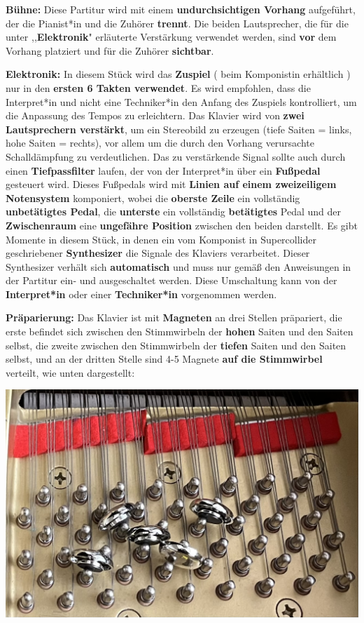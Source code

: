 \documentclass[12pt]{article}
\newcommand*\circled[1]{\tikz[baseline=(char.base)]{
            \node[shape=circle,draw,inner sep=1pt] (char) {#1};}}
\begin{document}
\begingroup
\textbf{Bühne: \circled{1}} Diese Partitur wird mit einem \textbf{undurchsichtigen Vorhang} aufgeführt, der die Pianist*in und die Zuhörer \textbf{trennt}. Die beiden Lautsprecher, die für die unter ,,\textbf{Elektronik}" erläuterte Verstärkung verwendet werden, sind \textbf{vor} dem Vorhang platziert und für die Zuhörer \textbf{sichtbar}.
\endgroup

\begingroup
\textbf{Elektronik: \circled{1}} In diesem Stück wird das \textbf{Zuspiel} ( beim Komponistin erhältlich ) nur in den \textbf{ersten 6 Takten verwendet}. Es wird empfohlen, dass die Interpret*in und nicht eine Techniker*in den Anfang des Zuspiels kontrolliert, um die Anpassung des Tempos zu erleichtern. \textbf{\circled{2}} Das Klavier wird von \textbf{zwei Lautsprechern verstärkt}, um ein Stereobild zu erzeugen (tiefe Saiten = links, hohe Saiten = rechts), vor allem um die durch den Vorhang verursachte Schalldämpfung zu verdeutlichen. \textbf{\circled{3}} Das zu verstärkende Signal sollte auch durch einen \textbf{Tiefpassfilter} laufen, der von der Interpret*in über ein \textbf{Fußpedal} gesteuert wird. Dieses Fußpedals wird mit \textbf{Linien auf einem zweizeiligem Notensystem} komponiert, wobei die \textbf{oberste Zeile} ein vollständig \textbf{unbetätigtes Pedal}, die \textbf{unterste} ein vollständig \textbf{betätigtes} Pedal und der \textbf{Zwischenraum} eine \textbf{ungefähre Position} zwischen den beiden darstellt. \textbf{\circled{4}} Es gibt Momente in diesem Stück, in denen ein vom Komponist in Supercollider geschriebener \textbf{Synthesizer} die Signale des Klaviers verarbeitet. Dieser Synthesizer verhält sich \textbf{automatisch} und muss nur gemäß den Anweisungen in der Partitur ein- und ausgeschaltet werden. Diese Umschaltung kann von der \textbf{Interpret*in} oder einer \textbf{Techniker*in} vorgenommen werden.
\endgroup

\begingroup
\textbf{Präparierung: \circled{1}} Das Klavier ist mit \textbf{Magneten} an drei Stellen präpariert, die erste befindet sich zwischen den Stimmwirbeln der \textbf{hohen} Saiten und den Saiten selbst, die zweite zwischen den Stimmwirbeln der \textbf{tiefen} Saiten und den Saiten selbst, und an der dritten Stelle sind 4-5 Magnete \textbf{auf  die Stimmwirbel} verteilt, wie unten dargestellt:

\begin{center}
\includegraphics[scale=0.70]{magnets.jpg}
\end{center}
\end{document}
